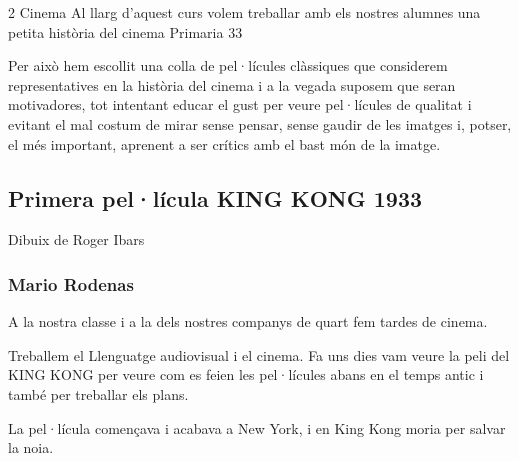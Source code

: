 \begin{news}
{2} %
{Cinema}
{Al llarg d’aquest curs volem treballar amb els nostres alumnes una petita història del cinema}
{Primaria}
{33} %

Per això hem escollit una colla de pel·lícules clàssiques que considerem representatives en la història del cinema i a la vegada suposem que  seran motivadores, tot intentant educar el gust per veure pel·lícules de qualitat i evitant el mal costum de mirar sense pensar, sense gaudir de  les imatges i, potser, el més important, aprenent a ser crítics amb el bast món de la imatge.

\subsection*{Primera pel·lícula KING KONG 1933}

\noindent{}

Dibuix de Roger Ibars

\subsubsection*{Mario Rodenas}

A la nostra classe i a la dels nostres companys de quart fem tardes de cinema.

Treballem el Llenguatge audiovisual i el cinema. Fa uns dies vam veure la peli del KING KONG per veure com es feien les pel·lícules abans en el temps antic i també per treballar els plans.

La pel·lícula començava i acabava a New York, i en King Kong moria per salvar la noia.



\noindent{}


\end{news}
